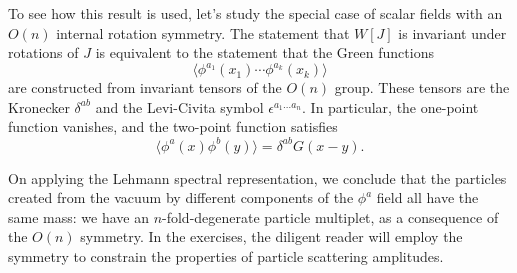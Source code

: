 
To see how this result is used, let's study the special case of scalar fields
with an $O(n)$ internal rotation symmetry. The statement that $W[J]$ is
invariant under rotations of $J$ is equivalent to the statement that the Green
functions
\begin{equation*}
  \langle\phi^{a_1}(x_1)\cdots\phi^{a_k}(x_k)\rangle
\end{equation*}
are constructed from invariant tensors of the $O(n)$ group. These tensors are
the Kronecker $\delta^{ab}$ and the Levi-Civita symbol
$\epsilon^{a_1\ldots a_n}$. In particular, the one-point function vanishes,
and the two-point function satisfies
\begin{equation*}
  \langle\phi^a(x)\phi^b(y)\rangle=\delta^{ab}G(x-y).
\end{equation*}

On applying the Lehmann spectral representation, we conclude that the particles
created from the vacuum by different components of the $\phi^a$ field all have
the same mass: we have an $n$-fold-degenerate particle multiplet, as a
consequence of the $O(n)$ symmetry. In the exercises, the diligent reader will
employ the symmetry to constrain the properties of particle scattering
amplitudes.

